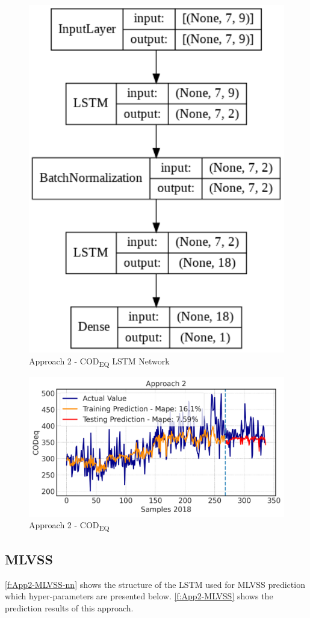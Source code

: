 \begin{figure}[h]
\centering
\includegraphics[width=0.4\linewidth]{figures/Ch5/App2_CODeq.pdf}
\caption{Approach 2 - COD\textsubscript{EQ} LSTM Network}
\label{f:App2-codeq-nn}
\end{figure}

\begin{figure}[h]
\centering
\includegraphics[width=\linewidth]{figures/Ch5/CODeq-2.pdf}
\caption{Approach 2 - COD\textsubscript{EQ}}
\label{f:App2-codeq}
\end{figure}

\subsection{MLVSS}
\autoref{f:App2-MLVSS-nn} shows the structure of the \ac{LSTM} used for \ac{MLVSS} prediction which hyper-parameters are presented below. \autoref{f:App2-MLVSS} shows the prediction results of this approach.

